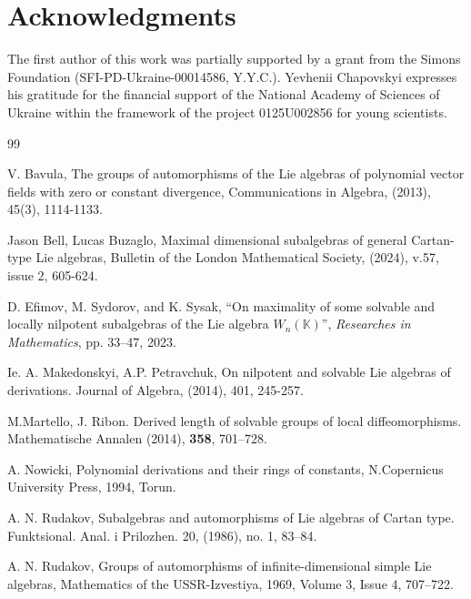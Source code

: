 \documentclass[12pt,a4paper]{amsart}
\theoremstyle{plain}
\theoremstyle{definition}
\begin{document}
\section*{Acknowledgments}
The first author of this work was partially supported by a grant
from the Simons Foundation (SFI-PD-Ukraine-00014586, Y.Y.C.).
Yevhenii Chapovskyi expresses his gratitude for the financial support of the National Academy of Sciences of Ukraine 
within the framework of the project 0125U002856 for young scientists.



\begin{thebibliography}{99}
	
V. Bavula, The groups of automorphisms of the Lie algebras of polynomial vector fields with zero or constant divergence, Communications in Algebra,  (2013),  45(3), 1114-1133.	

 Jason Bell,  Lucas  Buzaglo, Maximal dimensional subalgebras of general Cartan-type Lie algebras, Bulletin of the London
Mathematical Society, (2024), v.57, issue 2, 605-624.

 D. Efimov, M. Sydorov, and K. Sysak, ``On maximality of some solvable and locally nilpotent subalgebras of the Lie algebra $W_n(\mathbb{K})$'', \textit{Researches in Mathematics}, pp. 33--47, 2023.


  Ie. A.  Makedonskyi, A.P. Petravchuk, On nilpotent and solvable Lie algebras of derivations. Journal of Algebra, (2014), 401, 245-257.

 M.Martello, J. Ribon.  Derived length of solvable groups of local diffeomorphisms. Mathematische Annalen (2014),  {\bf 358},  701--728.

  A. Nowicki,  Polynomial derivations and their rings of constants,  N.Copernicus University Press,  1994, Torun.

  A. N. Rudakov, Subalgebras and automorphisms of Lie algebras of Cartan type. Funktsional. Anal. i Prilozhen. 20, (1986), no. 1, 83–84.

  A. N. Rudakov, Groups of automorphisms of infinite-dimensional simple Lie algebras, Mathematics of the USSR-Izvestiya, 1969, Volume 3, Issue 4, 707–722.

\end{thebibliography}
%
\end{document}
